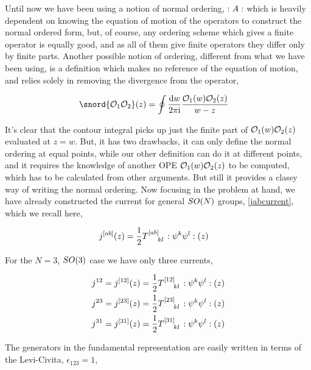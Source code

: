 \problem{}
\probitem{}

Until now we have been using a notion of normal ordering, $:A:$ which is heavily dependent on knowing the equation of motion 
of the operators to construct the normal ordered form, but, of course, any ordering scheme which gives a finite operator is equally good, and 
as all of them give finite operators they differ only by finite parts. Another possible notion of ordering, different from what we have been 
using, is a definition which makes no reference of the equation of motion, and relies solely in removing the divergence from the operator,

\begin{align*}
    \snord{\mathcal O_1\mathcal O_2}\qty(z)&=\oint\frac{\dd{w}}{2\pi\im}\frac{\mathcal O_1\qty(w)\mathcal O_2\qty(z)}{w-z}
\end{align*}

It's clear that the contour integral picks up just the finite part of $\mathcal O_1\qty(w)\mathcal O_2\qty(z)$ evaluated at $z=w$. But, it has 
two drawbacks, it can only define the normal ordering at equal points, while our other definition can do it at different points, and it requires 
the knowledge of another OPE $\mathcal O_1\qty(w)\mathcal O_2\qty(z)$ to be computed, which has to be calculated from other arguments. But still 
it provides a classy way of writing the normal ordering. Now focusing in the problem at hand, we have already constructed the current for 
general $SO\qty(N)$ groups, \ref{jabcurrent}, which we recall here,

\begin{align*}
    j^{\qty[ab]}\qty(z)&=\frac1 2\tensor{T}{^{\qty[ab]}_k_l}\cnord{\psi^k\psi^l}\qty(z)
\end{align*}

For the $N=3$, $SO\qty(3)$ case we have only three currents,

\begin{align*}
    j^{12}=j^{\qty[12]}\qty(z)&=\frac1 2\tensor{T}{^{\qty[12]}_k_l}\cnord{\psi^k\psi^l}\qty(z)\\
    j^{23}=j^{\qty[23]}\qty(z)&=\frac1 2\tensor{T}{^{\qty[23]}_k_l}\cnord{\psi^k\psi^l}\qty(z)\\
    j^{31}=j^{\qty[31]}\qty(z)&=\frac1 2\tensor{T}{^{\qty[31]}_k_l}\cnord{\psi^k\psi^l}\qty(z)
\end{align*}

The generators in the fundamental representation are easily written in terms of the Levi-Civita, $\epsilon_{123}=1$,

